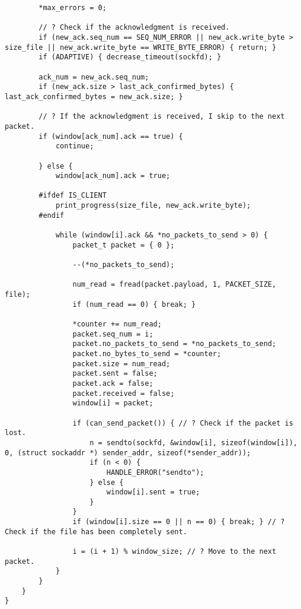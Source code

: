 \begin{lstlisting}
        *max_errors = 0;

        // ? Check if the acknowledgment is received.
        if (new_ack.seq_num == SEQ_NUM_ERROR || new_ack.write_byte > size_file || new_ack.write_byte == WRITE_BYTE_ERROR) { return; }
        if (ADAPTIVE) { decrease_timeout(sockfd); }

        ack_num = new_ack.seq_num;
        if (new_ack.size > last_ack_confirmed_bytes) { last_ack_confirmed_bytes = new_ack.size; }

        // ? If the acknowledgment is received, I skip to the next packet.
        if (window[ack_num].ack == true) {
            continue;

        } else {
            window[ack_num].ack = true;
        
        #ifdef IS_CLIENT
            print_progress(size_file, new_ack.write_byte);
        #endif

            while (window[i].ack && *no_packets_to_send > 0) {
                packet_t packet = { 0 };
                
                --(*no_packets_to_send);

                num_read = fread(packet.payload, 1, PACKET_SIZE, file);
                if (num_read == 0) { break; }

                *counter += num_read;
                packet.seq_num = i;
                packet.no_packets_to_send = *no_packets_to_send;
                packet.no_bytes_to_send = *counter;
                packet.size = num_read;
                packet.sent = false;
                packet.ack = false;
                packet.received = false;
                window[i] = packet;

                if (can_send_packet()) { // ? Check if the packet is lost.
                    n = sendto(sockfd, &window[i], sizeof(window[i]), 0, (struct sockaddr *) sender_addr, sizeof(*sender_addr));
                    if (n < 0) {
                        HANDLE_ERROR("sendto");
                    } else {
                        window[i].sent = true;
                    }
                }
                if (window[i].size == 0 || n == 0) { break; } // ? Check if the file has been completely sent.
                
                i = (i + 1) % window_size; // ? Move to the next packet.
            }
        }
    }
}
\end{lstlisting}

